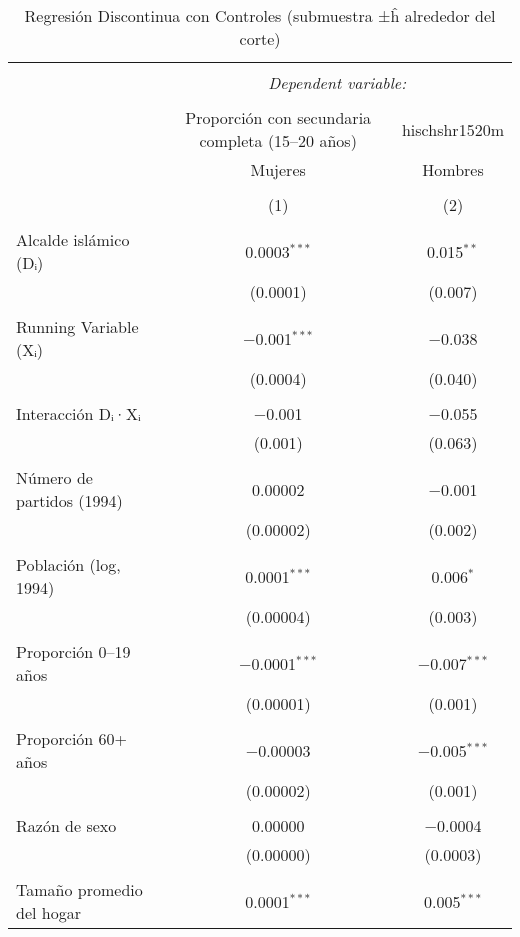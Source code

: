 
\begin{table}[ht!] \centering 
  \caption{Regresión Discontinua con Controles (submuestra ±ĥ alrededor del corte)} 
  \label{tab:rd_submuestra_h_mujeres_hombres} 
\begin{tabular}{@{\extracolsep{5pt}}lcc} 
\\[-1.8ex]\hline 
\hline \\[-1.8ex] 
 & \multicolumn{2}{c}{\textit{Dependent variable:}} \\ 
\cline{2-3} 
\\[-1.8ex] & Proporción con secundaria completa (15–20 años) & hischshr1520m \\ 
 & Mujeres & Hombres \\ 
\\[-1.8ex] & (1) & (2)\\ 
\hline \\[-1.8ex] 
 Alcalde islámico (Dᵢ) & 0.0003$^{***}$ & 0.015$^{**}$ \\ 
  & (0.0001) & (0.007) \\ 
  & & \\ 
 Running Variable (Xᵢ) & $-$0.001$^{***}$ & $-$0.038 \\ 
  & (0.0004) & (0.040) \\ 
  & & \\ 
 Interacción Dᵢ·Xᵢ & $-$0.001 & $-$0.055 \\ 
  & (0.001) & (0.063) \\ 
  & & \\ 
 Número de partidos (1994) & 0.00002 & $-$0.001 \\ 
  & (0.00002) & (0.002) \\ 
  & & \\ 
 Población (log, 1994) & 0.0001$^{***}$ & 0.006$^{*}$ \\ 
  & (0.00004) & (0.003) \\ 
  & & \\ 
 Proporción 0–19 años & $-$0.0001$^{***}$ & $-$0.007$^{***}$ \\ 
  & (0.00001) & (0.001) \\ 
  & & \\ 
 Proporción 60+ años & $-$0.00003 & $-$0.005$^{***}$ \\ 
  & (0.00002) & (0.001) \\ 
  & & \\ 
 Razón de sexo & 0.00000 & $-$0.0004 \\ 
  & (0.00000) & (0.0003) \\ 
  & & \\ 
 Tamaño promedio del hogar & 0.0001$^{***}$ & 0.005$^{***}$ \\ 

\end{tabular}
\end{table}

